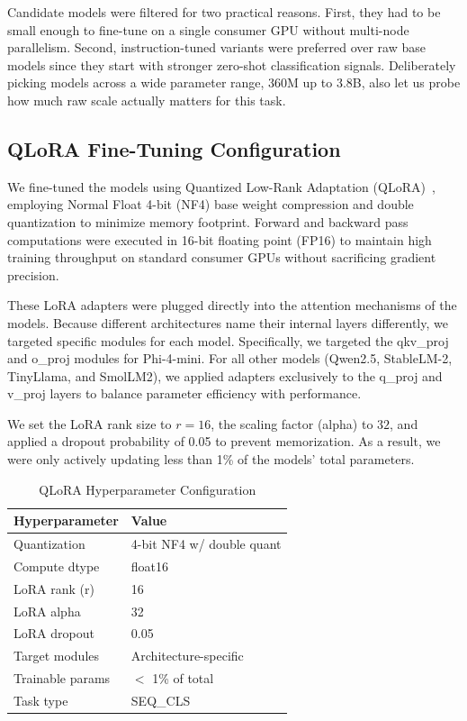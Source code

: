 \documentclass[journal]{IEEEtran}
\begin{document}
Candidate models were filtered for two practical reasons. First, they had to be small enough to fine-tune on a single consumer GPU without multi-node parallelism. Second, instruction-tuned variants were preferred over raw base models since they start with stronger zero-shot classification signals. Deliberately picking models across a wide parameter range, 360M up to 3.8B, also let us probe how much raw scale actually matters for this task.

\subsection{QLoRA Fine-Tuning Configuration}

We fine-tuned the models using Quantized Low-Rank Adaptation (QLoRA)~\cite{ref11}, employing Normal Float 4-bit (NF4) base weight compression and double quantization to minimize memory footprint. Forward and backward pass computations were executed in 16-bit floating point (FP16) to maintain high training throughput on standard consumer GPUs without sacrificing gradient precision.

These LoRA adapters were plugged directly into the attention mechanisms of the models. Because different architectures name their internal layers differently, we targeted specific modules for each model. Specifically, we targeted the qkv\_proj and o\_proj modules for Phi-4-mini. For all other models (Qwen2.5, StableLM-2, TinyLlama, and SmolLM2), we applied adapters exclusively to the q\_proj and v\_proj layers to balance parameter efficiency with performance.

We set the LoRA rank size to $r=16$, the scaling factor (alpha) to $32$, and applied a dropout probability of 0.05 to prevent memorization. As a result, we were only actively updating less than 1\% of the models' total parameters.

\begin{table}[htbp]
\caption{QLoRA Hyperparameter Configuration}
\label{tab:qlora}
\centering
\begin{tabular}{ll}
\toprule
\textbf{Hyperparameter} & \textbf{Value} \\
\midrule
Quantization & 4-bit NF4 w/ double quant \\
Compute dtype & float16 \\
LoRA rank (r) & 16 \\
LoRA alpha & 32 \\
LoRA dropout & 0.05 \\
Target modules & Architecture-specific \\
Trainable params & $<$ 1\% of total \\
Task type & SEQ\_CLS \\
\bottomrule
\end{tabular}
\end{table}
\end{document}
